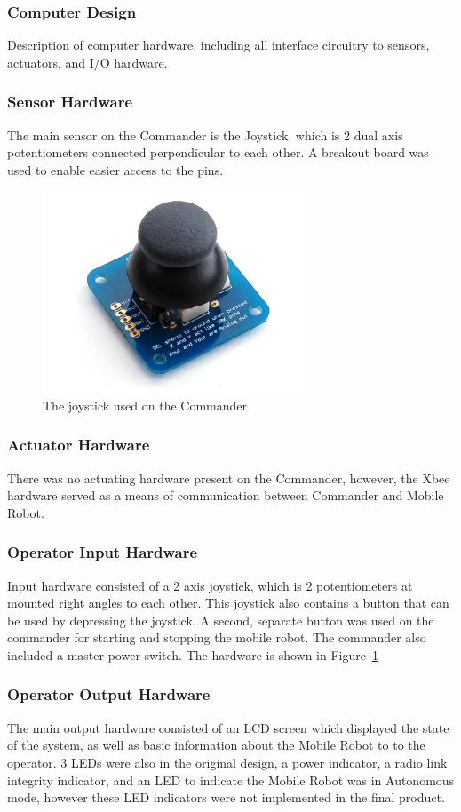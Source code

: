 \documentclass[11pt,a4paper]{article}
\begin{document}
    \subsubsection{Computer Design}
      Description of computer hardware, including all interface circuitry to sensors, actuators, and I/O hardware.
    \subsubsection{Sensor Hardware}
    The main sensor on the Commander is the Joystick, which is 2 dual axis potentiometers connected perpendicular to each other. A breakout board was used to enable easier access to the pins.
    \begin{figure}[h]
      \includegraphics[width=8cm]{joystick.png}
      \caption{The joystick used on the Commander}
      \label{fig:joystick}
    \end{figure}
    \subsubsection{Actuator Hardware}
      There was no actuating hardware present on the Commander, however, the Xbee hardware served as a means of communication between Commander and Mobile Robot.
    \subsubsection{Operator Input Hardware}
      Input hardware consisted of a 2 axis joystick, which is 2 potentiometers at mounted right angles to each other. This joystick also contains a button that can be used by depressing the joystick. A second, separate button was used on the commander for starting and stopping the mobile robot. The commander also included a master power switch. The hardware is shown in Figure~\ref{fig:joystick}
    \subsubsection{Operator Output Hardware}
      The main output hardware consisted of an LCD screen which displayed the state of the system, as well as basic information about the Mobile Robot to to the operator. 3 LEDs were also in the original design, a power indicator, a radio link integrity indicator, and an LED to indicate the Mobile Robot was in Autonomous mode, however these LED indicators were not implemented in the final product.
\end{document}
